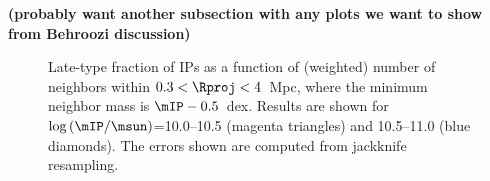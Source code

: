 {\bf(probably want another subsection with any plots we want to show from Behroozi discussion)}

\begin{figure}
  \epstrim{0.45in 0.1in 0.15in 0.3in}
  \caption{Late-type fraction of IPs as a function of (weighted) number of neighbors within {$0.3<\Rproj<4$~Mpc}, where the minimum neighbor mass is $\mIP-0.5$~dex.
Results are shown for $\log\,(\mIP/\msun)$={10.0--10.5} (magenta triangles) and {10.5--11.0} (blue diamonds).
The errors shown are computed from jackknife resampling.
}
  \label{fig:latefrac_vs_environ}
\end{figure}









